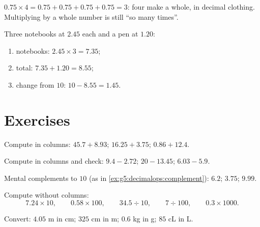\begin{example}\label{ex:g5:decimalops:mult}
$0.75 \times 4 = 0.75 + 0.75 + 0.75 + 0.75 = 3$: four  make
a whole, in decimal clothing. Multiplying by a whole number is still
``so many times''.
\end{example}

\begin{example}[Shopping]\label{ex:g5:decimalops:shopping}
Three notebooks at $2.45$ each and a pen at $1.20$:
\begin{enumerate}
  \item notebooks: $2.45 \times 3 = 7.35$;
  \item total: $7.35 + 1.20 = 8.55$;
  \item change from $10$: $10 - 8.55 = 1.45$.
\end{enumerate}
\end{example}

\section{Exercises}

\begin{exercise}[$\star$]\label{exo:g5:decimalops:1}
Compute in columns: $45.7 + 8.93$; \quad $16.25 + 3.75$; \quad
$0.86 + 12.4$.
\end{exercise}

\begin{exercise}[$\star$]\label{exo:g5:decimalops:2}
Compute in columns and check: $9.4 - 2.72$; \quad $20 - 13.45$;
\quad $6.03 - 5.9$.
\end{exercise}

\begin{exercise}[$\star$]\label{exo:g5:decimalops:3}
Mental complements to $10$ (as in
\cref{ex:g5:decimalops:complement}): $6.2$; \quad $3.75$; \quad
$9.99$.
\end{exercise}

\begin{exercise}[$\star$]\label{exo:g5:decimalops:4}
Compute without columns:
\[
7.24 \times 10, \qquad
0.58 \times 100, \qquad
34.5 \div 10, \qquad
7 \div 100, \qquad
0.3 \times 1000 .
\]
\end{exercise}

\begin{exercise}[$\star$]\label{exo:g5:decimalops:5}
Convert: $4.05$ m in cm; \quad $325$ cm in m; \quad $0.6$ kg in g;
\quad $85$ cL in L.
\end{exercise}

